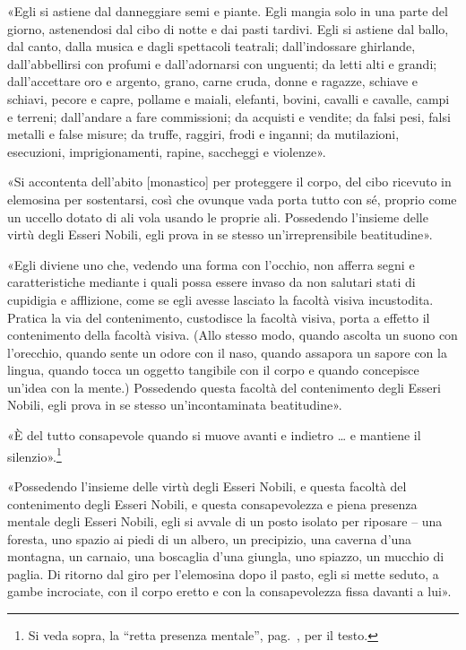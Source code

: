 «Egli si astiene dal danneggiare semi e piante. Egli mangia solo in una parte
del giorno, astenendosi dal cibo di notte e dai pasti tardivi. Egli si astiene
dal ballo, dal canto, dalla musica e dagli spettacoli teatrali; dall’indossare
ghirlande, dall’abbellirsi con profumi e dall’adornarsi con unguenti; da letti
alti e grandi; dall’accettare oro e argento, grano, carne cruda, donne e
ragazze, schiave e schiavi, pecore e capre, pollame e maiali, elefanti, bovini,
cavalli e cavalle, campi e terreni; dall’andare a fare commissioni; da acquisti
e vendite; da falsi pesi, falsi metalli e false misure; da truffe, raggiri,
frodi e inganni; da mutilazioni, esecuzioni, imprigionamenti, rapine, saccheggi
e violenze».

«Si accontenta dell’abito [monastico] per proteggere il corpo, del cibo ricevuto
in elemosina per sostentarsi, così che ovunque vada porta tutto con sé, proprio
come un uccello dotato di ali vola usando le proprie ali. Possedendo l’insieme
delle virtù degli Esseri Nobili, egli prova in se stesso un’irreprensibile
beatitudine».

«Egli diviene uno che, vedendo una forma con l’occhio, non afferra segni e
caratteristiche mediante i quali possa essere invaso da non salutari stati di
cupidigia e afflizione, come se egli avesse lasciato la facoltà visiva
incustodita. Pratica la via del contenimento, custodisce la facoltà visiva,
porta a effetto il contenimento della facoltà visiva. (Allo stesso modo, quando
ascolta un suono con l’orecchio, quando sente un odore con il naso, quando
assapora un sapore con la lingua, quando tocca un oggetto tangibile con il corpo
e quando concepisce un’idea con la mente.) Possedendo questa facoltà del
contenimento degli Esseri Nobili, egli prova in se stesso un’incontaminata
beatitudine».

«È del tutto consapevole quando si muove avanti e indietro … e mantiene il
silenzio».\footnote{Si veda sopra, la “retta presenza mentale”,
  pag.~\pageref{pag267}, per il testo.}

«Possedendo l’insieme delle virtù degli Esseri Nobili, e questa facoltà del
contenimento degli Esseri Nobili, e questa consapevolezza e piena presenza
mentale degli Esseri Nobili, egli si avvale di un posto isolato per riposare –
una foresta, uno spazio ai piedi di un albero, un precipizio, una caverna d’una
montagna, un carnaio, una boscaglia d’una giungla, uno spiazzo, un mucchio di
paglia. Di ritorno dal giro per l’elemosina dopo il pasto, egli si mette seduto,
a gambe incrociate, con il corpo eretto e con la consapevolezza fissa davanti a
lui».

